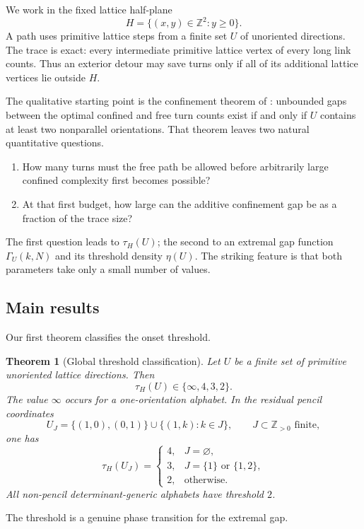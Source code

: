 \documentclass[11pt]{article}
\newtheorem{theorem}{Theorem}[section]
\theoremstyle{definition}
\newcommand{\Z}{\mathbb Z}
\begin{document}
We work in the fixed lattice half-plane
\[
H=\{(x,y)\in\Z^2:y\ge0\}.
\]
A path uses primitive lattice steps from a finite set $U$ of unoriented directions.  The trace is exact: every intermediate primitive lattice vertex of every long link counts.  Thus an exterior detour may save turns only if all of its additional lattice vertices lie outside $H$.

The qualitative starting point is the confinement theorem of \cite{RosalesPaperIIII}: unbounded gaps between the optimal confined and free turn counts exist if and only if $U$ contains at least two nonparallel orientations.  That theorem leaves two natural quantitative questions.

\begin{enumerate}[label=(Q\arabic*)]
\item How many turns must the free path be allowed before arbitrarily large confined complexity first becomes possible?
\item At that first budget, how large can the additive confinement gap be as a fraction of the trace size?
\end{enumerate}

The first question leads to $\tau_H(U)$; the second to an extremal gap function $\Gamma_U(k,N)$ and its threshold density $\eta(U)$.  The striking feature is that both parameters take only a small number of values.

\subsection{Main results}
Our first theorem classifies the onset threshold.

\begin{theorem}[Global threshold classification]\label{thm:global-tau}
Let $U$ be a finite set of primitive unoriented lattice directions.  Then
\[
\boxed{\tau_H(U)\in\{\infty,4,3,2\}.}
\]
The value $\infty$ occurs for a one-orientation alphabet.  In the residual pencil coordinates
\[
U_J=\{(1,0),(0,1)\}\cup\{(1,k):k\in J\},\qquad J\subset\Z_{>0}\text{ finite},
\]
one has
\[
\boxed{
\tau_H(U_J)=
\begin{cases}
4,&J=\varnothing,\\
3,&J=\{1\}\text{ or }\{1,2\},\\
2,&\text{otherwise}.
\end{cases}}
\]
All non-pencil determinant-generic alphabets have threshold $2$.
\end{theorem}

The threshold is a genuine phase transition for the extremal gap.
\end{document}
